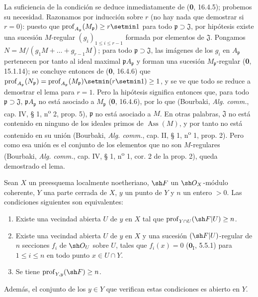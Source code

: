 La suficiencia de la condición se deduce inmediatamente de (\textbf{0}, 16.4.5);
probemos su necesidad. Razonamos por inducción sobre $r$ (no hay nada que
demostrar si $r=0$): puesto que
$\operatorname{prof}_{A_{\mathfrak p}}(M_{\mathfrak p})\geq r\setmin 1$ para todo
$\mathfrak p\supset\mathfrak J$, por hipótesis existe una sucesión
$M$-regular $(g_i)_{1\leq i\leq r-1}$ formada por elementos de $\mathfrak J$.
Pongamos $N=M/(g_1M+\ldots+g_{r-1}M)$; para todo
$\mathfrak p\supset\mathfrak J$, las imágenes de los $g_i$ en $A_{\mathfrak p}$
pertenecen por tanto al ideal maximal $\mathfrak pA_{\mathfrak p}$ y forman
una sucesión $M_{\mathfrak p}$-regular (\textbf{0}, 15.1.14); se concluye entonces de
(\textbf{0}, 16.4.6) que
$\operatorname{prof}_{A_{\mathfrak p}}(N_{\mathfrak p})=\operatorname{prof}_{A_{\mathfrak p}}(M_{\mathfrak p})\setmin(r\setmin 1)\geq1$, y se ve
que todo se reduce a demostrar el lema para $r=1$. Pero la hipótesis significa
entonces que, para todo $\mathfrak p\supset\mathfrak J$,
$\mathfrak pA_{\mathfrak p}$ no está asociado a $M_{\mathfrak p}$
(\textbf{0}, 16.4.6), por lo que (Bourbaki, \emph{Alg. comm.}, cap. IV, § 1,
n\textsuperscript{o} 2, prop. 5), $\mathfrak p$ no está asociado a $M$. En
otras palabras, $\mathfrak J$ no está contenido en ninguno de los ideales
primos de $\operatorname{Ass}(M)$, y por tanto no está contenido en su unión
(Bourbaki, \emph{Alg. comm.}, cap. II, § 1, n\textsuperscript{o} 1, prop. 2).
Pero como esa unión es el conjunto de los elementos que no son $M$-regulares
(Bourbaki, \emph{Alg. comm.}, cap. IV, § 1, n\textsuperscript{o} 1, cor. 2 de
la prop. 2), queda demostrado el lema.

\begin{proposition}[19.9.3]
\label{IV.19.9.3}
Sean $X$ un preesquema localmente noetheriano, $\sh F$ un
$\sh O_X$-módulo coherente, $Y$ una parte cerrada de $X$, $y$ un punto de
$Y$ y $n$ un entero $>0$. Las condiciones siguientes son equivalentes:
\begin{enumerate}
  \item[\textup{a)}] Existe una vecindad abierta $U$ de $y$ en $X$ tal que
  $\operatorname{prof}_{Y\cap U}(\sh F|U)\geq n$.
  \item[\textup{b)}] Existe una vecindad abierta $U$ de $y$ en $X$ y una sucesión
  $(\sh F|U)$-regular de $n$ secciones $f_i$ de $\sh O_U$ sobre $U$, tales que
  $f_i(x)=0$ \textup{($\mathbf{0}_{\mathrm I}$, 5.5.1)} para $1\leq i\leq n$ en todo punto
  $x\in U\cap Y$.
  \item[\textup{c)}] Se tiene $\operatorname{prof}_{Y,y}(\sh F)\geq n$.
\end{enumerate}
Además, el conjunto de los $y\in Y$ que verifican estas condiciones es abierto
en $Y$.
\end{proposition}

